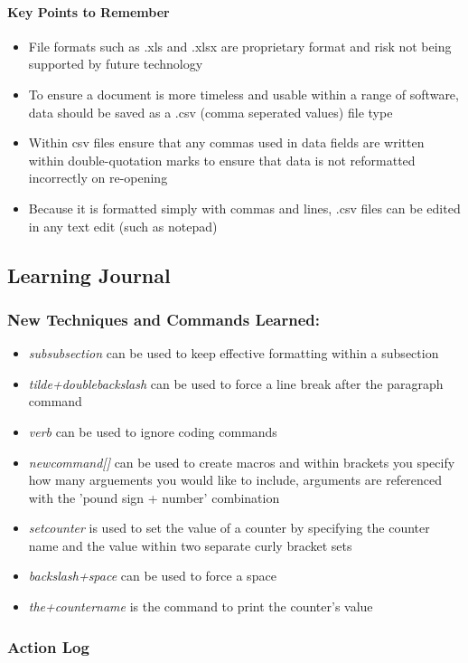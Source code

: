\documentclass[12pt]{article}
\newcommand{\learning}[2]{\item \textit{#1} \textnormal{#2}}
\begin{document}
\paragraph{Key Points to Remember}
\begin{itemize}
    \item File formats such as .xls and .xlsx are proprietary format and risk not being supported by future technology
    \item To ensure a document is more timeless and usable within a range of software, data should be saved as a .csv (comma seperated values) file type
    \item Within csv files ensure that any commas used in data fields are written within double-quotation marks to ensure that data is not reformatted incorrectly on re-opening
    \item Because it is formatted simply with commas and lines, .csv files can be edited in any text edit (such as notepad)
\end{itemize}

\subsection{Learning Journal}

\subsubsection{New Techniques and Commands Learned:}
\begin{itemize}
    \learning{subsubsection}{can be used to keep effective formatting within a subsection}
    \learning{tilde+doublebackslash}{can be used to force a line break after the paragraph command}
    \learning{verb}{can be used to ignore coding commands}
    \learning{newcommand[]}{can be used to create macros and within brackets you specify how many arguements you would like to include, arguments are referenced with the 'pound sign + number' combination}
    \learning{setcounter}{is used to set the value of a counter by specifying the counter name and the value within two separate curly bracket sets}
    \learning{backslash+space}{can be used to force a space}
    \learning{the+countername}{is the command to print the counter's value}
\end{itemize}

\subsubsection{Action Log}
\end{document}

